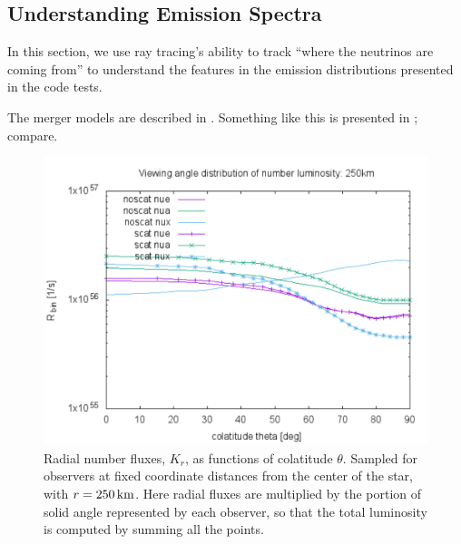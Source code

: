 \documentclass[aps,floatfix,prd,superscriptaddress,twocolumn]{revtex4-1}
\newcommand{\todo}[1]{\marginpar{\tiny{\textcolor{red}{#1}}}}
\renewcommand\todo[1]{} %
\begin{document}
\subsection{Understanding Emission Spectra}
\label{ssec:spectra}
In this section, we use ray tracing's ability to track ``where the neutrinos
are coming from'' to understand the features in the emission distributions
presented in the code tests.

The merger models are described in \cite{fouc2015-m1_nsbh, fouc2016-m1_nsns}.
Something like this is presented in \cite[Figs.~10-11]{pere2014-nu_wind};
compare.
\todo{here focus on plots of $J(\cos A)$, $H^r(\cos A)$, and $J(\varepsilon)$}

\begin{figure}
  \includegraphics[width=\columnwidth]{theta_distrib-250km-luminosity_R}
  \caption{Radial number fluxes, $K_r$, as functions of colatitude $\theta$.
    Sampled for observers at fixed coordinate distances from the center
    of the star, with $r=250\,{\rm km}$.
    Here radial fluxes are multiplied by the portion of solid angle
    represented by each observer, so that the total luminosity is
    computed by summing all the points.}
  \label{fig:nsns_theta_distrib_R}
\end{figure}
\end{document}
